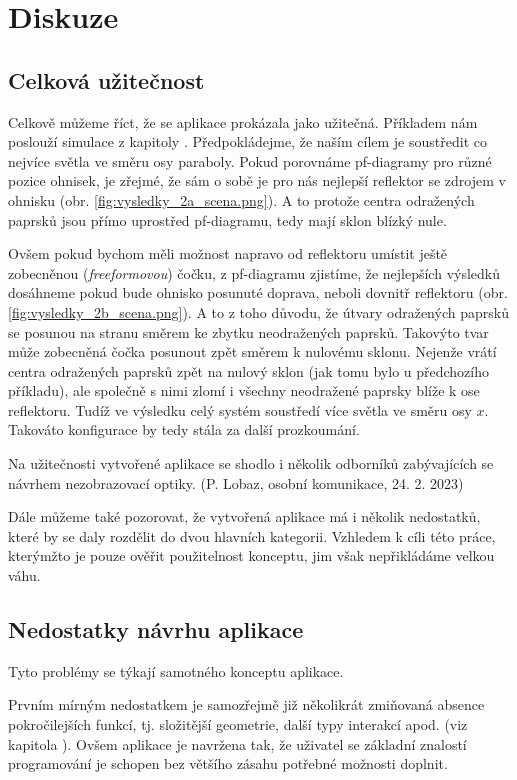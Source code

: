 \chapter{Diskuze}

\section{Celková užitečnost}

Celkově můžeme říct, že se aplikace prokázala jako užitečná. Příkladem nám poslouží simulace z kapitoly . Předpokládejme, že naším cílem je soustředit co nejvíce světla ve směru osy paraboly. Pokud porovnáme pf-diagramy pro různé pozice ohnisek, je zřejmé, že sám o sobě je pro nás nejlepší reflektor se zdrojem v ohnisku (obr. \ref{fig:vysledky_2a_scena.png}). A to protože centra odražených paprsků jsou přímo uprostřed pf-diagramu, tedy mají sklon blízký nule.

Ovšem pokud bychom měli možnost napravo od reflektoru umístit ještě zobecněnou (\emph{freeformovou}) čočku, z pf-diagramu zjistíme, že nejlepších výsledků dosáhneme pokud bude ohnisko posunuté doprava, neboli dovnitř reflektoru (obr. \ref{fig:vysledky_2b_scena.png}). A to z toho důvodu, že útvary odražených paprsků se posunou na stranu směrem ke zbytku neodražených paprsků. Takovýto tvar může zobecněná čočka posunout zpět směrem k nulovému sklonu. Nejenže vrátí centra odražených paprsků zpět na nulový sklon (jak tomu bylo u předchozího příkladu), ale společně s nimi zlomí i všechny neodražené paprsky blíže k ose reflektoru. Tudíž ve výsledku celý systém soustředí více světla ve směru osy $x$. Takováto konfigurace by tedy stála za další prozkoumání.

Na užitečnosti vytvořené aplikace se shodlo i několik odborníků zabývajících se návrhem nezobrazovací optiky. (P. Lobaz, osobní komunikace, 24. 2. 2023)

Dále můžeme také pozorovat, že vytvořená aplikace má i několik nedostatků, které by se daly rozdělit do dvou hlavních kategorii. Vzhledem k cíli této práce, kterýmžto je pouze ověřit použitelnost konceptu, jim však nepřikládáme velkou váhu.

\section{Nedostatky návrhu aplikace}

Tyto problémy se týkají samotného konceptu aplikace.

Prvním mírným nedostatkem je samozřejmě již několikrát zmiňovaná absence pokročilejších funkcí, tj. složitější geometrie, další typy interakcí apod. (viz kapitola ). Ovšem aplikace je navržena tak, že uživatel se základní znalostí programování je schopen bez většího zásahu potřebné možnosti doplnit.

